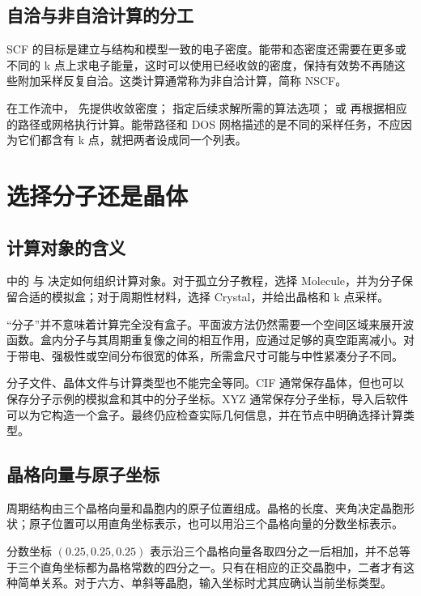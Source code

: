 \subsection{自洽与非自洽计算的分工}

SCF 的目标是建立与结构和模型一致的电子密度。能带和态密度还需要在更多或不同的 k 点上求电子能量，这时可以使用已经收敛的密度，保持有效势不再随这些附加采样反复自洽。这类计算通常称为非自洽计算，简称 NSCF。

在工作流中， 先提供收敛密度； 指定后续求解所需的算法选项； 或  再根据相应的路径或网格执行计算。能带路径和 DOS 网格描述的是不同的采样任务，不应因为它们都含有 k 点，就把两者设成同一个列表。

\section{选择分子还是晶体}

\subsection{计算对象的含义}

 中的  与  决定如何组织计算对象。对于孤立分子教程，选择 Molecule，并为分子保留合适的模拟盒；对于周期性材料，选择 Crystal，并给出晶格和 k 点采样。

“分子”并不意味着计算完全没有盒子。平面波方法仍然需要一个空间区域来展开波函数。盒内分子与其周期重复像之间的相互作用，应通过足够的真空距离减小。对于带电、强极性或空间分布很宽的体系，所需盒尺寸可能与中性紧凑分子不同。

分子文件、晶体文件与计算类型也不能完全等同。CIF 通常保存晶体，但也可以保存分子示例的模拟盒和其中的分子坐标。XYZ 通常保存分子坐标，导入后软件可以为它构造一个盒子。最终仍应检查实际几何信息，并在节点中明确选择计算类型。

\subsection{晶格向量与原子坐标}

周期结构由三个晶格向量和晶胞内的原子位置组成。晶格的长度、夹角决定晶胞形状；原子位置可以用直角坐标表示，也可以用沿三个晶格向量的分数坐标表示。

分数坐标 $(0.25,0.25,0.25)$ 表示沿三个晶格向量各取四分之一后相加，并不总等于三个直角坐标都为晶格常数的四分之一。只有在相应的正交晶胞中，二者才有这种简单关系。对于六方、单斜等晶胞，输入坐标时尤其应确认当前坐标类型。


